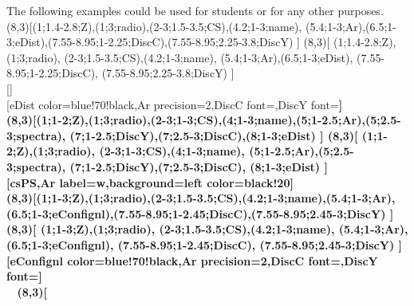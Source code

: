 The following examples could be used for students or for any other purposes.
\\ [10pt]\pgfPTMbuildcell(8,3)[(1;1.4-2.8;Z),(1;3;radio),(2-3;1.5-3.5;CS),(4.2;1-3;name), %
(5.4;1-3;Ar),(6.5;1-3;eDist),(7.55-8.95;1-2.25;DiscC),(7.55-8.95;2.25-3.8;DiscY)%
]%
\pgfPTbuildcell(8,3)[%
(1;1.4-2.8;Z),(1;3;radio),%
(2-3;1.5-3.5;CS),(4.2;1-3;name),%
(5.4;1-3;Ar),(6.5;1-3;eDist),%
(7.55-8.95;1-2.25;DiscC),%
(7.55-8.95;2.25-3.8;DiscY)%
]%
\\ [-4pt][]%
\\ [10pt]\makebox[\linewidth][c]{\scalebox{.6}{\pgfPT}}%
\vfill%
[eDist color=blue!70!black,Ar precision=2,DiscC font=\string\fontsize{4}{4}\string\selectfont,DiscY font=\string\fontsize{4}{4}\string\selectfont\string\bfseries]
\\ [10pt]\makebox[\linewidth][c]{\scalebox{.6}{\pgfPT[eDist color=blue!70!black,Ar precision=2,DiscC font=\fontsize{4}{4}\selectfont,DiscY font=\fontsize{4}{4}\selectfont\bfseries]}}%
\newpage%
\pgfPTMbuildcell(8,3)[(1;1-2;Z),(1;3;radio),(2-3;1-3;CS),(4;1-3;name),(5;1-2.5;Ar),(5;2.5-3;spectra), %
(7;1-2.5;DiscY),(7;2.5-3;DiscC),(8;1-3;eDist)%
]%
\pgfPTbuildcell(8,3)[%
(1;1-2;Z),(1;3;radio),%
(2-3;1-3;CS),(4;1-3;name),%
(5;1-2.5;Ar),(5;2.5-3;spectra),%
(7;1-2.5;DiscY),(7;2.5-3;DiscC),%
(8;1-3;eDist)%
]%
\\ [-4pt][csPS,Ar label=w,background={left color=black!20}]%
\\ [10pt]\makebox[\linewidth][c]{\scalebox{.6}{\pgfPT[csPS,Ar label=w,background={left color=black!20}]}}%
\vfill%
\pgfPTMbuildcell(8,3)[(1;1-3;Z),(1;3;radio),(2-3;1.5-3.5;CS),(4.2;1-3;name),(5.4;1-3;Ar), %
(6.5;1-3;eConfignl),(7.55-8.95;1-2.45;DiscC),(7.55-8.95;2.45-3;DiscY)%
]%
\pgfPTbuildcell(8,3)[%
(1;1-3;Z),(1;3;radio),%
(2-3;1.5-3.5;CS),(4.2;1-3;name),%
(5.4;1-3;Ar),%
(6.5;1-3;eConfignl),%
(7.55-8.95;1-2.45;DiscC),%
(7.55-8.95;2.45-3;DiscY)%
]%
\\ [-4pt][eConfignl color=blue!70!black,Ar precision=2,DiscC font=\string\fontsize{4}{4}\string\selectfont,DiscY font=\string\fontsize{4}{4}\string\selectfont\string\bfseries]%
\\ [10pt]\makebox[\linewidth][c]{\scalebox{.6}{\pgfPT[eConfignl color=blue!70!black,Ar precision=2,DiscC font=\fontsize{4}{4}\selectfont,DiscY font=\fontsize{4}{4}\selectfont\bfseries]}}%
\newpage\ %
\vfill%
\pgfPTbuildcell(8,3)[%
